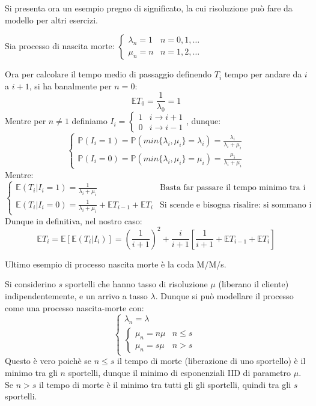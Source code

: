 Si presenta ora un esempio pregno di significato, la cui risoluzione può fare da modello per altri esercizi.
\begin{example}
Sia processo di nascita morte: $\begin{cases}
\lambda_n=1 & n=0,1,\dots \\
\mu_n=n & n=1,2,\dots
\end{cases}$


Ora per calcolare il tempo medio di passaggio definendo $T_i$ tempo per andare da $i$ a $i+1$, si ha banalmente per $n=0$:
\[\mathbb{E}T_0=\frac{1}{\lambda_0}=1\]
Mentre per $n\neq1$ definiamo $I_i=\begin{cases}
1 & i\longrightarrow i+1 \\
0 & i\longrightarrow i-1
\end{cases}$, dunque:
\[\begin{cases}
\mathbb{P}(I_i=1)=\mathbb{P}\left(min\{\lambda_i,\mu_i\}=\lambda_i\right)=\frac{\lambda_i}{\lambda_i+\mu_i} \\
\mathbb{P}(I_i=0)=\mathbb{P}\left(min\{\lambda_i,\mu_i\}=\mu_i\right)=\frac{\mu_i}{\lambda_i+\mu_i}
\end{cases}\]
Mentre:
\[\begin{cases}
\mathbb{E}(T_i|I_i=1)=\frac{1}{\lambda_i+\mu_i} & \text{Basta far passare il tempo minimo tra i due} \\
\mathbb{E}(T_i|I_i=0)=\frac{1}{\lambda_i+\mu_i}+\mathbb{E}T_{i-1}+\mathbb{E}T_i & \text{Si scende e bisogna risalire: si sommano i tempi}
\end{cases}\]
Dunque in definitiva, nel nostro caso:
\[\mathbb{E}T_i=\mathbb{E}\left[\mathbb{E}\left(T_i|I_i\right)\right]=\left(\frac{1}{i+1}\right)^2+\frac{i}{i+1}\left[\frac{1}{i+1}+\mathbb{E}T_{i-1}+\mathbb{E}T_i\right]\]
\end{example}

Ultimo esempio di processo nascita morte è la coda M/M/s. 

\begin{example}Si considerino $s$ sportelli che hanno tasso di risoluzione  $\mu$ (liberano il cliente) indipendentemente, e un arrivo a tasso $\lambda$. Dunque si può modellare il processo come una processo nascita-morte con:
\[\begin{cases}
\lambda_n=\lambda \\
\begin{cases}
\mu_n=n\mu & n\leq s \\
\mu_n=s\mu & n>s
\end{cases}
\end{cases}\]
Questo è vero poichè se $n\leq s$ il tempo di morte (liberazione di uno sportello) è il minimo tra gli $n$ sportelli, dunque il minimo di esponenziali IID di parametro $\mu$. Se $n>s$ il tempo di morte è il minimo tra tutti gli gli sportelli, quindi tra gli $s$ sportelli.
\end{example}